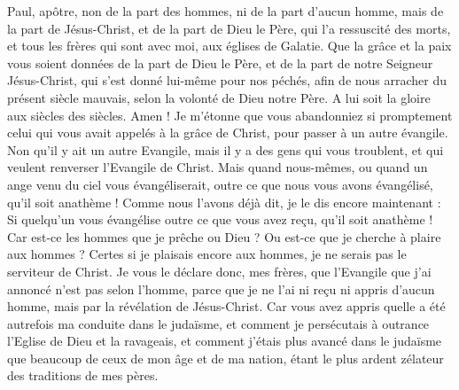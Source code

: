 \begin{multicols}{2}
\VerseOne{}Paul, apôtre, non de la part des hommes, ni de la part d'aucun homme, mais de la part de Jésus-Christ, et de la part de Dieu le Père, qui l'a ressuscité des morts,
et tous les frères qui sont avec moi, aux églises de Galatie.
Que la grâce et la paix vous soient données de la part de Dieu le Père, et de la part de notre Seigneur Jésus-Christ,
qui s'est donné lui-même pour nos péchés, afin de nous arracher du présent siècle mauvais, selon la volonté de Dieu notre Père.
A lui soit la gloire aux siècles des siècles. Amen !
Je m'étonne que vous abandonniez si promptement celui qui vous avait appelés à la grâce de Christ, pour passer à un autre évangile. 
Non qu'il y ait un autre Evangile, mais il y a des gens qui vous troublent, et qui veulent renverser l'Evangile de Christ.
Mais quand nous-mêmes, ou quand un ange venu du ciel vous évangéliserait, outre ce que nous vous avons évangélisé, qu'il soit anathème !
Comme nous l'avons déjà dit, je le dis encore maintenant : Si quelqu'un vous évangélise outre ce que vous avez reçu, qu'il soit anathème !
Car est-ce les hommes que je prêche ou Dieu ? Ou est-ce que je cherche à plaire aux hommes ? Certes si je plaisais encore aux hommes, je ne serais pas le serviteur de Christ.
Je vous le déclare donc, mes frères, que l'Evangile que j'ai annoncé n'est pas selon l’homme,
parce que je ne l'ai ni reçu ni appris d’aucun homme, mais par la révélation de Jésus-Christ.
Car vous avez appris quelle a été autrefois ma conduite dans le judaïsme, et comment je persécutais à outrance l'Eglise de Dieu et la ravageais,
et comment j’étais plus avancé dans le judaïsme que beaucoup de ceux de mon âge et de ma nation, étant le plus ardent zélateur des traditions de mes pères.

\end{multicols}
